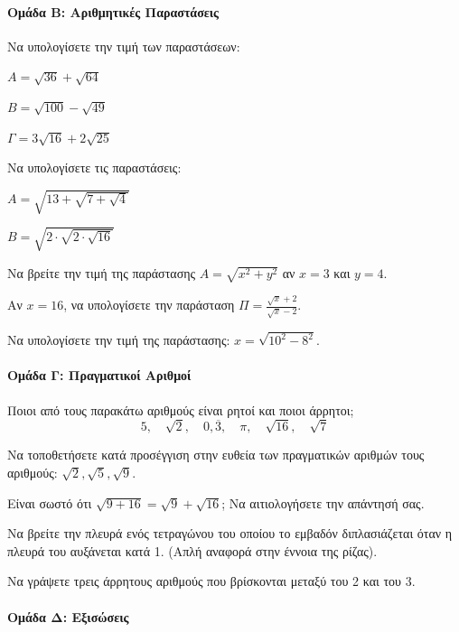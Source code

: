 \documentclass[11pt,a4paper,modern]{FFExercises}
\begin{document}
\paragraph{Ομάδα Β: Αριθμητικές Παραστάσεις}

\askhsh Να υπολογίσετε την τιμή των παραστάσεων:
\begin{alist}
    \item $A = \sqrt{36} + \sqrt{64}$
    \item $B = \sqrt{100} - \sqrt{49}$
    \item $\Gamma = 3\sqrt{16} + 2\sqrt{25}$
\end{alist}

\askhsh Να υπολογίσετε τις παραστάσεις:
\begin{alist}
    \item $A = \sqrt{13 + \sqrt{7 + \sqrt{4}}}$
    \item $B = \sqrt{2 \cdot \sqrt{2 \cdot \sqrt{16}}}$
\end{alist}

\askhsh Να βρείτε την τιμή της παράστασης $A = \sqrt{x^2 + y^2}$ αν $x=3$ και $y=4$.

\askhsh Αν $x=16$, να υπολογίσετε την παράσταση $\Pi = \frac{\sqrt{x} + 2}{\sqrt{x} - 2}$.

\askhsh Να υπολογίσετε την τιμή της παράστασης: $x = \sqrt{10^2 - 8^2}$.

\paragraph{Ομάδα Γ: Πραγματικοί Αριθμοί}

\askhsh Ποιοι από τους παρακάτω αριθμούς είναι ρητοί και ποιοι άρρητοι;
\[ 5, \quad \sqrt{2}, \quad 0, \overline{3}, \quad \pi, \quad \sqrt{16}, \quad \sqrt{7} \]

\askhsh Να τοποθετήσετε κατά προσέγγιση στην ευθεία των πραγματικών αριθμών τους αριθμούς: $\sqrt{2}, \sqrt{5}, \sqrt{9}$.

\askhsh Είναι σωστό ότι $\sqrt{9+16} = \sqrt{9} + \sqrt{16}$; Να αιτιολογήσετε την απάντησή σας.

\askhsh Να βρείτε την πλευρά ενός τετραγώνου του οποίου το εμβαδόν διπλασιάζεται όταν η πλευρά του αυξάνεται κατά 1. (Απλή αναφορά στην έννοια της ρίζας).

\askhsh Να γράψετε τρεις άρρητους αριθμούς που βρίσκονται μεταξύ του 2 και του 3.

\paragraph{Ομάδα Δ: Εξισώσεις}
\end{document}

